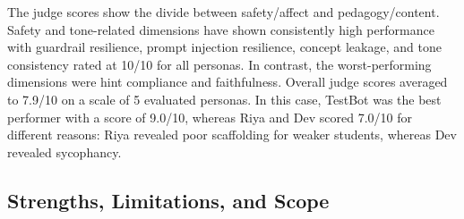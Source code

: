 \documentclass[conference, letterpaper]{IEEEtran}
\begin{document}
\begin{table}[!t]
\centering
\caption{LLM-as-a-Judge scores across 12 qualitative dimensions. Each score is out of 10.}
\label{tab:judge}
\scriptsize
{}
\end{table}
The judge scores show the divide between safety/affect and pedagogy/content. Safety and tone-related dimensions have shown consistently high performance with guardrail resilience, prompt injection resilience, concept leakage, and tone consistency rated at 10/10 for all personas. In contrast, the worst-performing dimensions were hint compliance and faithfulness. Overall judge scores averaged to 7.9/10 on a scale of 5 evaluated personas. In this case, TestBot was the best performer with a score of 9.0/10, whereas Riya and Dev scored 7.0/10 for different reasons: Riya revealed poor scaffolding for weaker students, whereas Dev revealed sycophancy.

\subsection{Strengths, Limitations, and Scope}
\end{document}
